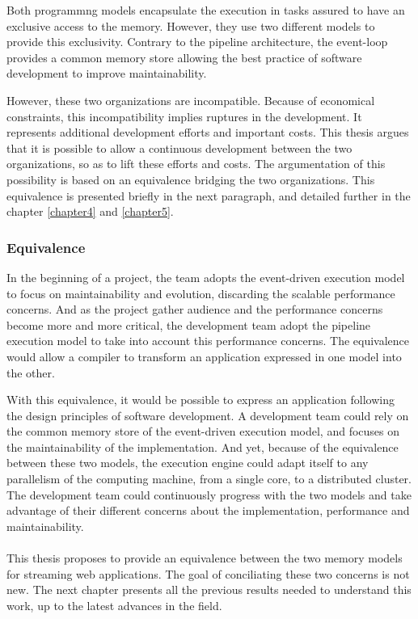 Both programmng models encapsulate the execution in tasks assured to have an exclusive access to the memory.
However, they use two different models to provide this exclusivity.
Contrary to the pipeline architecture, the event-loop provides a common memory store allowing the best practice of software development to improve maintainability.

However, these two organizations are incompatible.
Because of economical constraints, this incompatibility implies ruptures in the development.
It represents additional development efforts and important costs.
This thesis argues that it is possible to allow a continuous development between the two organizations, so as to lift these efforts and costs.
The argumentation of this possibility is based on an equivalence bridging the two organizations.
This equivalence is presented briefly in the next paragraph, and detailed further in the chapter \ref{chapter4} and \ref{chapter5}.

\subsubsection{Equivalence}

In the beginning of a project, the team adopts the event-driven execution model to focus on maintainability and evolution, discarding the scalable performance concerns.
And as the project gather audience and the performance concerns become more and more critical, the development team adopt the pipeline execution model to take into account this performance concerns.
The equivalence would allow a compiler to transform an application expressed in one model into the other.

With this equivalence, it would be possible to express an application following the design principles of software development.
A development team could rely on the common memory store of the event-driven execution model, and focuses on the maintainability of the implementation.
And yet, because of the equivalence between these two models, the execution engine could adapt itself to any parallelism of the computing machine, from a single core, to a distributed cluster.
The development team could continuously progress with the two models and take advantage of their different concerns about the implementation, performance and maintainability.

\paragraph{}

This thesis proposes to provide an equivalence between the two memory models for streaming web applications.
The goal of conciliating these two concerns is not new.
The next chapter presents all the previous results needed to understand this work, up to the latest advances in the field.